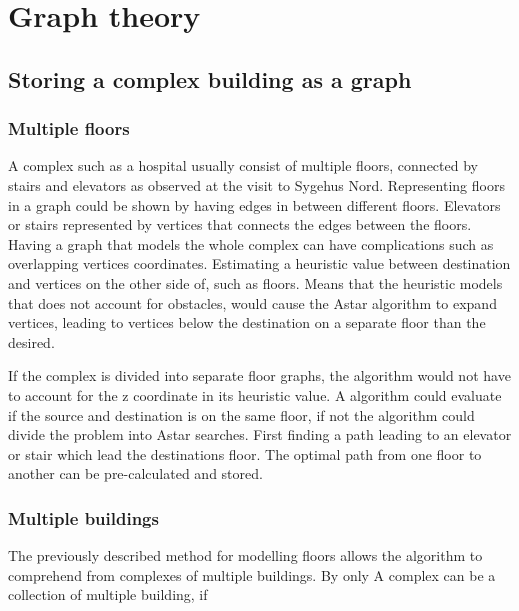 \section{Graph theory}

\subsection{Storing a complex building as a graph}
\subsubsection{Multiple floors}

A complex such as a hospital usually consist of multiple floors, connected by stairs and elevators as observed at the visit to Sygehus Nord. Representing floors in a graph could be shown by having edges in between different floors. Elevators or stairs represented by vertices that connects the edges between the floors. Having a graph that models the whole complex can have complications such as overlapping vertices coordinates. Estimating a heuristic value between destination and vertices on the other side of, such as floors. Means that the heuristic models that does not account for obstacles, would cause the Astar algorithm to expand vertices, leading to vertices below the destination on a separate floor than the desired.


If the complex is divided into separate floor graphs, the algorithm would not have to account for the z coordinate in its heuristic value. A algorithm could evaluate if the source and destination is on the same floor, if not the algorithm could divide the problem into Astar searches. First finding a path leading to an elevator or stair which lead the destinations floor. The optimal path from one floor to another can be pre-calculated and stored. 


\subsubsection{Multiple buildings}

The previously described method for modelling floors allows the algorithm to comprehend from complexes of multiple buildings. By only  
A complex can be a collection of multiple building, if  
